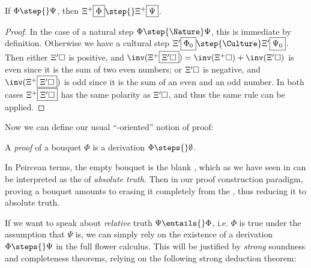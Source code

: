 \begin{lemma}
  If $\Phi \step{} \Psi$, then $\Xi^+\select{\Phi} \step{} \Xi^+\select{\Psi}$.
\end{lemma}
\begin{proof}
  In the case of a natural step $\Phi \step{\Nature} \Psi$, this is immediate
  by definition. Otherwise we have a cultural step $\Xi'\select{\Phi_0}
  \step{\Culture} \Xi'\select{\Psi_0}$. Then either $\Xi'\square$ is positive,
  and $\inv(\Xi^+\select{\Xi'\hole}) = \inv(\Xi^+\hole) + \inv(\Xi'\hole)$ is
  even since it is the sum of two even numbers; or $\Xi'\square$ is negative, and
  $\inv(\Xi^+\select{\Xi'\hole})$ is odd since it is the sum of an even and an
  odd number. In both cases $\Xi^+\fbox{$\Xi'\square$}$ has the same polarity as
  $\Xi'\square$, and thus the same rule can be applied.
\end{proof}

Now we can define our usual ``-oriented'' notion of proof:

\begin{definition}[Proof]
  A \emph{proof} of a bouquet $\Phi$ is a derivation $\Phi \steps{} \emptyset$.
\end{definition}

In Peircean terms, the empty bouquet is the blank , which as
we have seen in  can be interpreted as the  of \emph{absolute
truth}. Then in our proof construction paradigm, proving a bouquet amounts to
erasing it completely from the , thus reducing it to absolute
truth.

If we want to speak about \emph{relative} truth $\Psi \entails{} \Phi$, i.e. $\Phi$
is true under the assumption that $\Psi$ is, we can simply rely on the existence
of a derivation $\Phi \steps{} \Psi$ in the full flower calculus. This will be
justified by \emph{strong} soundness and completeness theorems, relying on the
following strong deduction theorem:

